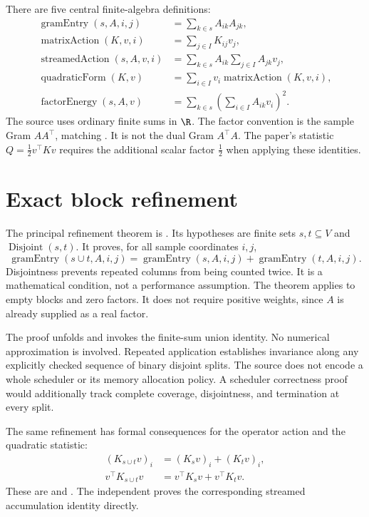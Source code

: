 There are five central finite-algebra definitions:
\begin{align*}
 \operatorname{gramEntry}(s,A,i,j)&=\sum_{k\in s}A_{ik}A_{jk},\\[6pt]
 \operatorname{matrixAction}(K,v,i)&=\sum_{j\in I}K_{ij}v_j,\\[6pt]
 \operatorname{streamedAction}(s,A,v,i)&=\sum_{k\in s}A_{ik}\sum_{j\in I}A_{jk}v_j,\\[6pt]
 \operatorname{quadraticForm}(K,v)&=\sum_{i\in I}v_i\operatorname{matrixAction}(K,v,i),\\[6pt]
 \operatorname{factorEnergy}(s,A,v)&=\sum_{k\in s}\left(\sum_{i\in I}A_{ik}v_i\right)^2.
\end{align*}
The source uses ordinary finite sums in $\R$. The factor convention is the
sample Gram $AA^\top$, matching . It is not the dual
Gram $A^\top A$. The paper's statistic $Q=\tfrac12 v^\top Kv$ requires the
additional scalar factor $\tfrac12$ when applying these identities.

\section{Exact block refinement}

The principal refinement theorem is . Its hypotheses
are finite sets $s,t\subseteq V$ and $\operatorname{Disjoint}(s,t)$. It proves,
for all sample coordinates $i,j$,
\[
 \operatorname{gramEntry}(s\cup t,A,i,j)
 =\operatorname{gramEntry}(s,A,i,j)+\operatorname{gramEntry}(t,A,i,j).
\]
Disjointness prevents repeated columns from being counted twice. It is a
mathematical condition, not a performance assumption. The theorem applies to
empty blocks and zero factors. It does not require positive weights, since
$A$ is already supplied as a real factor.

The proof unfolds  and invokes the finite-sum union identity.
No numerical approximation is involved. Repeated application establishes
invariance along any explicitly checked sequence of binary disjoint splits.
The source does not encode a whole scheduler or its memory allocation policy.
A scheduler correctness proof would additionally track complete coverage,
disjointness, and termination at every split.

The same refinement has formal consequences for the operator action and the
quadratic statistic:
\begin{align*}
 (K_{s\cup t}v)_i&=(K_s v)_i+(K_t v)_i,\\
 v^\top K_{s\cup t}v&=v^\top K_s v+v^\top K_t v.
\end{align*}
These are  and
. The independent
 proves the corresponding streamed accumulation
identity directly.

